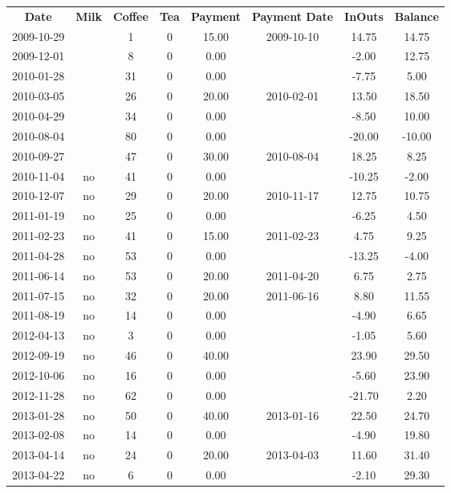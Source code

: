 \begin{center}
\begin{tabular}{cccccccc}
\textbf{Date} & \textbf{Milk} & \textbf{Coffee} & \textbf{Tea} & \textbf{Payment} & \textbf{Payment Date} & \textbf{InOuts} & \textbf{Balance} \\
2009-10-29 &  &  1 & 0 & 15.00 & 2009-10-10 &  14.75 &  14.75\\ 
2009-12-01 &  &  8 & 0 &  0.00 &  &  -2.00 &  12.75\\ 
2010-01-28 &  & 31 & 0 &  0.00 &  &  -7.75 &   5.00\\ 
2010-03-05 &  & 26 & 0 & 20.00 & 2010-02-01 &  13.50 &  18.50\\ 
2010-04-29 &  & 34 & 0 &  0.00 &  &  -8.50 &  10.00\\ 
2010-08-04 &  & 80 & 0 &  0.00 &  & -20.00 & -10.00\\ 
2010-09-27 &  & 47 & 0 & 30.00 & 2010-08-04 &  18.25 &   8.25\\ 
2010-11-04 & no & 41 & 0 &  0.00 &  & -10.25 &  -2.00\\ 
2010-12-07 & no & 29 & 0 & 20.00 & 2010-11-17 &  12.75 &  10.75\\ 
2011-01-19 & no & 25 & 0 &  0.00 &  &  -6.25 &   4.50\\ 
2011-02-23 & no & 41 & 0 & 15.00 & 2011-02-23 &   4.75 &   9.25\\ 
2011-04-28 & no & 53 & 0 &  0.00 &  & -13.25 &  -4.00\\ 
2011-06-14 & no & 53 & 0 & 20.00 & 2011-04-20 &   6.75 &   2.75\\ 
2011-07-15 & no & 32 & 0 & 20.00 & 2011-06-16 &   8.80 &  11.55\\ 
2011-08-19 & no & 14 & 0 &  0.00 &  &  -4.90 &   6.65\\ 
2012-04-13 & no &  3 & 0 &  0.00 &  &  -1.05 &   5.60\\ 
2012-09-19 & no & 46 & 0 & 40.00 &  &  23.90 &  29.50\\ 
2012-10-06 & no & 16 & 0 &  0.00 &  &  -5.60 &  23.90\\ 
2012-11-28 & no & 62 & 0 &  0.00 &  & -21.70 &   2.20\\ 
2013-01-28 & no & 50 & 0 & 40.00 & 2013-01-16 &  22.50 &  24.70\\ 
2013-02-08 & no & 14 & 0 &  0.00 &  &  -4.90 &  19.80\\ 
2013-04-14 & no & 24 & 0 & 20.00 & 2013-04-03 &  11.60 &  31.40\\ 
2013-04-22 & no &  6 & 0 &  0.00 &  &  -2.10 &  29.30
\end{tabular}
\end{center}

